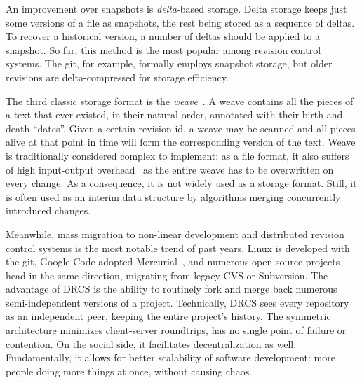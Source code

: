 \documentclass{acm_proc_article-sp}
\begin{document}
An improvement over snapshots is \emph{delta}-based storage.
Delta storage keeps just some versions of a file as snapshots, the rest being stored as a sequence of deltas.
To recover a historical version, a number of deltas should be applied to a snapshot.
So far, this method is the most popular among revision control systems.
The git, for example, formally employs snapshot storage, but older revisions are delta-compressed for storage efficiency. 

The third classic storage format is the  \emph{weave}~\cite{rcs-txt,revctrl-weave}. 
A weave contains all the pieces of a text that ever existed, in their natural order, annotated with their birth and death ``dates''.
Given a certain revision id, a weave may be scanned and all pieces alive at that point in time will form the corresponding version of the text.
Weave is traditionally considered complex to implement; as a file format, it also suffers of high input-output overhead~\cite{bazaar-weave} as the entire weave has to be overwritten on every change.
As a consequence, it is not widely used as a storage format.
Still, it is often used as an interim data structure by algorithms merging concurrently introduced changes.

Meanwhile, mass migration to non-linear development and distributed revision control systems is the most notable trend of past years.
Linux is developed with the git, Google Code adopted Mercurial~\cite{mercurial}, and numerous open source projects head in the same direction, migrating from legacy CVS or Subversion.
The advantage of DRCS is the ability to routinely fork and merge back numerous semi-independent versions of a project.
Technically, DRCS sees every repository as an independent peer, keeping the entire project's history. The symmetric architecture minimizes client-server roundtrips, has no single point of failure or contention.
On the social side, it facilitates decentralization as well.
Fundamentally, it allows for better scalability of software development: more people doing more things at once, without causing chaos.
\end{document}
